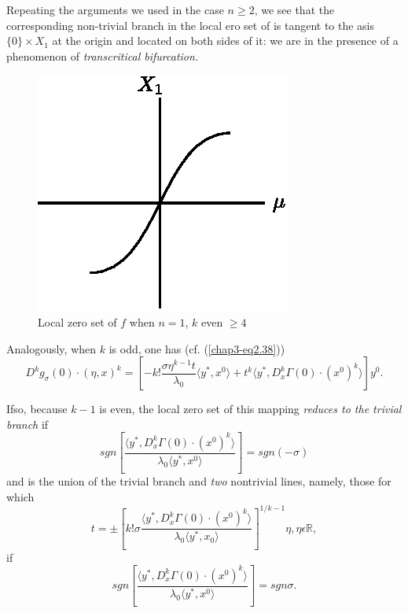 Repeating the arguments we used in the case $n \geq 2$, we see that
the corresponding non-trivial branch in the local ero set of is
tangent to the asis $\{0\} \times X_{1}$ at the origin and located on
both sides of it: we are in the presence of a phenomenon of {\em
  transcritical bifurcation.}
\begin{figure}[H]
\centering
\includegraphics{figure/fig76-2.5.eps}
\caption{Local zero set of $f$ when $n=1$, $k$ even $\geq 4$}
\end{figure}

Analogously, when $k$ is odd, one has (cf. (\ref{chap3-eq2.38}))
$$
D^{k}g_{\sigma}(0) \cdot (\eta, x)^{k} = \left[-k! \frac{\sigma
    \eta^{k-1} t}{\lambda_{0}} \langle y^{*}, x^{0} \rangle  + t^{k} \langle y^{*},
  D_{x}^{k}\Gamma(0) \cdot (x^{0})^{k} \rangle \right]y^{0}.
$$

If\pageoriginale so, because $k-1$ is even, the local zero set of this
mapping {\em reduces to the trivial branch} if
$$
sgn \left[\frac{ \langle y^{*}, 
    D_{x}^{k}\Gamma(0)\cdot(x^{0})^{k} \rangle }{\lambda_{0} \langle y^{*},
    x^{0} \rangle }\right] = sgn (-\sigma)
$$ 
and is the union of the trivial branch and {\em two} nontrivial lines,
namely, those for which 
$$
t = \pm \left[k! \sigma \frac{\langle y^{*}, D_{x}^{k}\Gamma(0) \cdot
    (x^{0})^{k} \rangle}{\lambda_{0} \langle y^{*}, x_{0} \rangle}\right]^{1/k - 1} \eta,
\eta \epsilon \mathbb{R},
$$
if 
$$
sgn \left[\frac{\langle y^{*}, D_{x}^{k}\Gamma(0)
   \cdot(x^{0})^{k} \rangle }{\lambda_{0} \langle y^{*}, x^{0} \rangle }\right] = sgn \sigma.
$$


